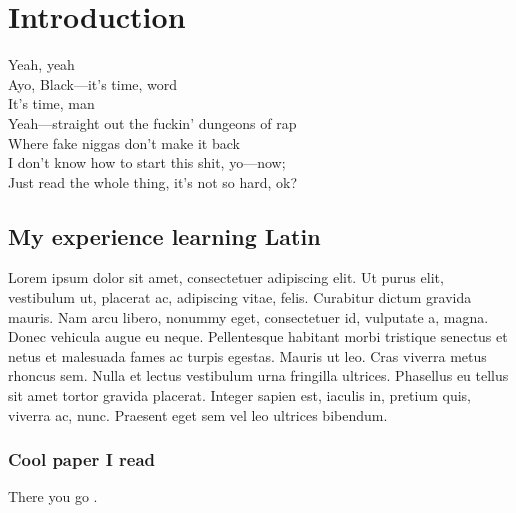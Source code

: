 

\Clear
\chapter{Introduction}
\label{cha:introduction}

Yeah, yeah \\
Ayo, Black—it's time, word \\
It's time, man \\
Yeah—straight out the fuckin' dungeons of rap \\
Where fake niggas don't make it back \\
I don't know how to start this shit, yo—now; \\

Just read the whole thing, it's not so hard, ok?

\section{My experience learning Latin}
\label{sec:my_experience_learning_latin}

Lorem ipsum dolor sit amet, consectetuer adipiscing elit. Ut purus elit, vestibulum ut, placerat ac, adipiscing vitae, felis.
Curabitur dictum gravida mauris. Nam arcu libero, nonummy eget, consectetuer id, vulputate a, magna. Donec vehicula augue eu neque.
Pellentesque habitant morbi tristique senectus et netus et malesuada fames ac
turpis egestas. Mauris ut leo. Cras viverra metus rhoncus sem. Nulla et lectus
vestibulum urna fringilla ultrices. Phasellus eu tellus sit amet tortor gravida
placerat. Integer sapien est, iaculis in, pretium quis, viverra ac, nunc. Praesent
eget sem vel leo ultrices bibendum.

\subsection{Cool paper I read}
\label{sub:cool_paper_i_read}

There you go \cite{Vonnegut:1975}.
